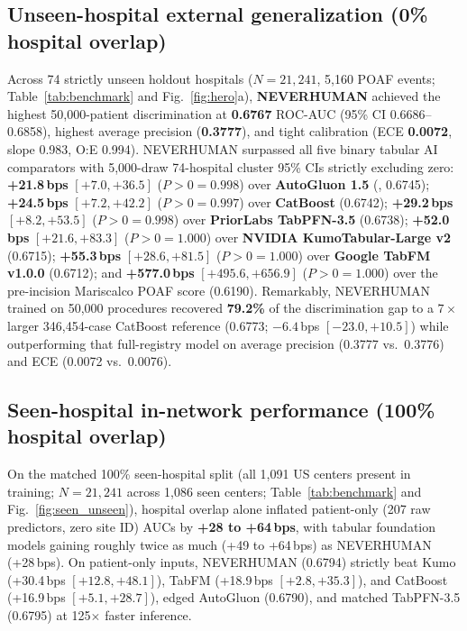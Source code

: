 \subsection{Unseen-hospital external generalization (0\% hospital overlap)}
Across 74 strictly unseen holdout hospitals ($N{=}21{,}241$, 5,160 POAF events; Table~\ref{tab:benchmark} and Fig.~\ref{fig:hero}a), \textbf{NEVERHUMAN} achieved the highest 50,000-patient discrimination at \textbf{0.6767} ROC-AUC (95\% CI 0.6686--0.6858), highest average precision (\textbf{0.3777}), and tight calibration (ECE \textbf{0.0072}, slope 0.983, O:E 0.994). NEVERHUMAN surpassed all five binary tabular AI comparators with 5,000-draw 74-hospital cluster 95\% CIs strictly excluding zero: \textbf{+21.8\,bps} $[+7.0, +36.5]$ ($P{>}0 = 0.998$) over \textbf{AutoGluon 1.5} (, 0.6745); \textbf{+24.5\,bps} $[+7.2, +42.2]$ ($P{>}0 = 0.997$) over \textbf{CatBoost} (0.6742); \textbf{+29.2\,bps} $[+8.2, +53.5]$ ($P{>}0 = 0.998$) over \textbf{PriorLabs TabPFN-3.5} (0.6738); \textbf{+52.0\,bps} $[+21.6, +83.3]$ ($P{>}0 = 1.000$) over \textbf{NVIDIA KumoTabular-Large v2} (0.6715); \textbf{+55.3\,bps} $[+28.6, +81.5]$ ($P{>}0 = 1.000$) over \textbf{Google TabFM v1.0.0} (0.6712); and \textbf{+577.0\,bps} $[+495.6, +656.9]$ ($P{>}0 = 1.000$) over the pre-incision Mariscalco POAF score (0.6190). Remarkably, NEVERHUMAN trained on 50,000 procedures recovered \textbf{79.2\%} of the discrimination gap to a $7\times$ larger 346,454-case CatBoost reference (0.6773; $-6.4$\,bps $[-23.0, +10.5]$) while outperforming that full-registry model on average precision (0.3777 vs.\ 0.3776) and ECE (0.0072 vs.\ 0.0076).



\subsection{Seen-hospital in-network performance (100\% hospital overlap)}
On the matched 100\% seen-hospital split (all 1,091 US centers present in training; $N{=}21{,}241$ across 1,086 seen centers; Table~\ref{tab:benchmark} and Fig.~\ref{fig:seen_unseen}), hospital overlap alone inflated patient-only (207 raw predictors, zero site ID) AUCs by \textbf{+28 to +64\,bps}, with tabular foundation models gaining roughly twice as much (+49 to +64\,bps) as NEVERHUMAN (+28\,bps). On patient-only inputs, NEVERHUMAN (0.6794) strictly beat Kumo (+30.4\,bps $[+12.8, +48.1]$), TabFM (+18.9\,bps $[+2.8, +35.3]$), and CatBoost (+16.9\,bps $[+5.1, +28.7]$), edged AutoGluon (0.6790), and matched TabPFN-3.5 (0.6795) at 125$\times$ faster inference.

